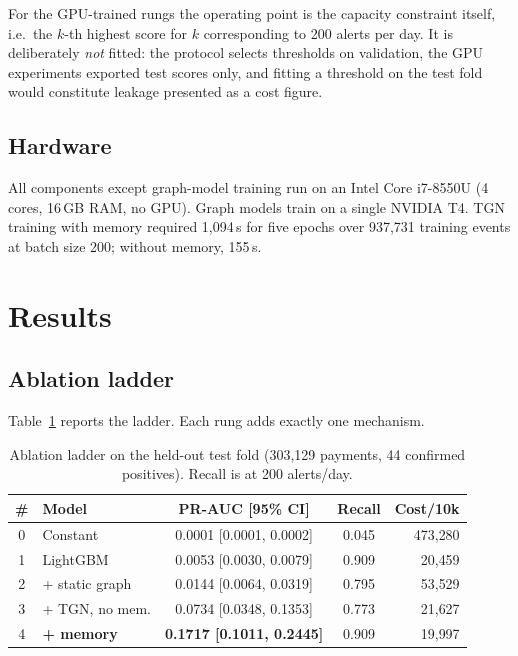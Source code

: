 \documentclass[conference]{IEEEtran}
\begin{document}
For the GPU-trained rungs the operating point is the capacity constraint itself,
i.e.\ the $k$-th highest score for $k$ corresponding to 200 alerts per day. It
is deliberately \emph{not} fitted: the protocol selects thresholds on validation,
the GPU experiments exported test scores only, and fitting a threshold on the
test fold would constitute leakage presented as a cost figure.

\subsection{Hardware}

All components except graph-model training run on an Intel Core i7-8550U
(4 cores, 16\,GB RAM, no GPU). Graph models train on a single NVIDIA T4. TGN
training with memory required 1{,}094\,s for five epochs over 937{,}731 training
events at batch size 200; without memory, 155\,s.

\section{Results}
\label{sec:results}

\subsection{Ablation ladder}

Table~\ref{tab:ladder} reports the ladder. Each rung adds exactly one mechanism.

\begin{table}[t]
\caption{Ablation ladder on the held-out test fold (303{,}129 payments,
44 confirmed positives). Recall is at 200 alerts/day.}
\label{tab:ladder}
\centering
\footnotesize
\setlength{\tabcolsep}{4pt}
\begin{tabular}{clccr}
\toprule
\# & Model & PR-AUC [95\% CI] & Recall & Cost/10k \\
\midrule
0 & Constant & 0.0001 [0.0001, 0.0002] & 0.045 & 473{,}280 \\
1 & LightGBM & 0.0053 [0.0030, 0.0079] & 0.909 & 20{,}459 \\
2 & + static graph & 0.0144 [0.0064, 0.0319] & 0.795 & 53{,}529 \\
3 & + TGN, no mem. & 0.0734 [0.0348, 0.1353] & 0.773 & 21{,}627 \\
4 & \textbf{+ memory} & \textbf{0.1717 [0.1011, 0.2445]} & 0.909 & 19{,}997 \\
\bottomrule
\end{tabular}
\end{table}
\end{document}
